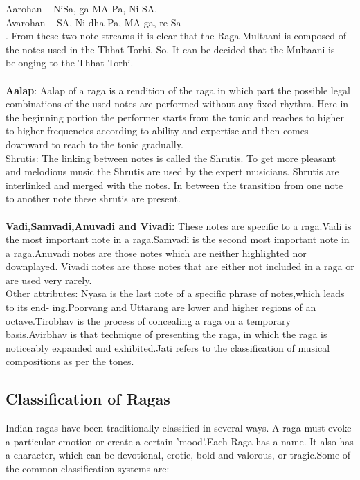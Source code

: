 \documentclass[12pt,a4paper]{article}
\begin{document}
Aarohan – NiSa, ga MA Pa, Ni SA. \\
Avarohan – SA, Ni dha Pa, MA ga, re Sa \\.
From these two note streams it is clear that the Raga Multaani is composed of the notes used in the Thhat Torhi. So. It can be decided that the Multaani is belonging to the Thhat Torhi.
\paragraph{}					
{\textbf{Aalap}}: Aalap of a raga is a rendition of the raga in which part the possible legal combinations of the used notes are performed without any fixed rhythm. Here in the beginning portion the performer starts from the tonic and reaches to higher to higher frequencies according to ability and expertise and then comes downward to reach to the tonic gradually. 
\\					
Shrutis: The linking between notes is called the Shrutis. To get more pleasant and melodious music the Shrutis are used by the expert musicians. Shrutis are interlinked and merged with the notes. In between the transition from one note to another note these shrutis are present.
\paragraph{}
						
{\textbf{Vadi,Samvadi,Anuvadi and Vivadi: }}These notes are specific to a raga.Vadi is the most important note in a raga.Samvadi is the second most important note in a raga.Anuvadi notes are those notes which are neither highlighted nor downplayed. Vivadi notes are those notes that are either not included in a raga or are used very rarely.
					\\
Other attributes: Nyasa is the last note of a specific phrase of notes,which leads to its end- ing.Poorvang and Uttarang are lower and higher regions of an octave.Tirobhav is the process of concealing a raga on a temporary basis.Avirbhav is that technique of presenting the raga, in which the raga is noticeably expanded and exhibited.Jati refers to the classification of musical compositions as per the tones.
\subsection{Classification of Ragas}
Indian ragas have been traditionally classified in several ways. A raga must evoke a particular emotion or create a certain ’mood’.Each Raga has a name. It also has a character, which can be devotional, erotic, bold and valorous, or tragic.Some of the common classification systems are:\\
\end{document}
